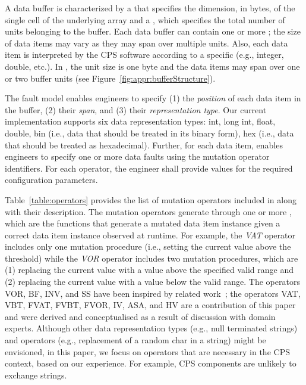 A data buffer is characterized by a  that specifies the dimension, in bytes, of the single cell of the underlying array and a , which specifies the total number of units belonging to the buffer. Each data buffer can contain one or more ; the size of data items may vary as they may span over multiple units. Also, each data item is interpreted by the CPS software according to a specific  (e.g., integer, double, etc.). 
In \ESAIL, the unit size is one byte and the data items may span over one or two buffer units (see Figure~\ref{fig:appr:bufferStructure}). 

The \APPR fault model enables engineers to specify (1) the \emph{position} of each data item in the buffer, (2) their \emph{span}, and (3) their \emph{representation type}. Our current implementation supports six data representation types: int, long int, float, double, bin (i.e., data that should be treated in its binary form), hex (i.e., data that should be treated as hexadecimal).
Further, for each data item, \APPR enables engineers to specify one or more data faults using the mutation operator identifiers. For each operator, the engineer 
shall provide values for the required configuration parameters.

Table~\ref{table:operators} provides the list of mutation operators included in \APPR along with their description. The \APPR mutation operators generate  through one or more , which are the functions that generate a mutated data item instance given a correct data item instance observed at runtime. For example, the \emph{VAT} operator includes only one mutation procedure (i.e., setting the current value above the threshold) while the \emph{VOR} operator includes two mutation procedures, which are
(1) replacing the current value with a value above the specified valid range and (2) replacing the current value with a value below the valid range.
The operators VOR, BF, INV, and SS have been inspired by related work~\cite{di2015generating,PeachFuzzer,Matinnejad19}; the operators VAT, VBT, FVAT, FVBT, FVOR, IV, ASA,  and HV
are a contribution of this paper and were derived and conceptualised as a result of discussion with domain experts.
Although other data representation types (e.g., null terminated strings) and operators (e.g., replacement of a random char in a string) might be envisioned, in this paper, we focus on operators that are necessary in the CPS context, based on our experience.
For example, CPS components are unlikely to exchange strings.

